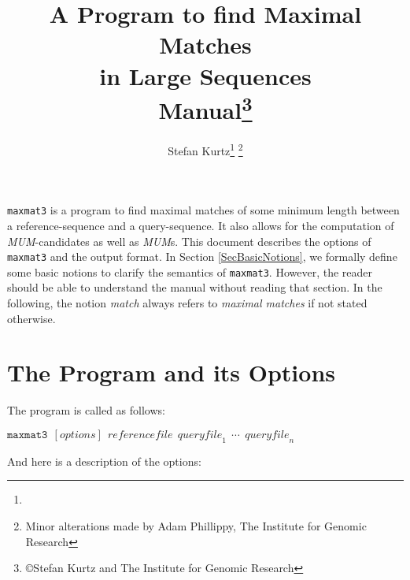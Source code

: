 \documentclass[12pt]{article}
\author{Stefan Kurtz\thanks{\SKaffiliation} \thanks{Minor alterations
  made by Adam Phillippy, The Institute for Genomic Research}}
\title{\textbf{A Program to find Maximal Matches}\\
       \textbf{in Large Sequences}\\[2mm]
       \textbf{Manual}\footnote{\copyright Stefan Kurtz and The
       Institute for Genomic Research}}
\newcommand{\MMthree}{\texttt{maxmat3}\xspace}
\newcommand{\MUM}[0]{\textit{MUM}\xspace}
\begin{document}
\maketitle

\MMthree is a program to find maximal matches of some minimum length 
between a reference-sequence and a query-sequence.  It also allows for
the computation of \MUM-candidates as well as \MUM{s}. This document
describes the options of \MMthree and the output format. In Section 
\ref{SecBasicNotions}, we formally define some basic notions to clarify
the semantics of \MMthree. However, the reader should be able to understand 
the manual without reading that section. In the following, the notion
\emph{match}  always refers to \emph{maximal matches} if not stated
otherwise.

\section{The Program and its Options}

The program is called as follows:

$\MMthree~~[\mathit{options}]~~\mathit{referencefile}~~
           \mathit{queryfile}_{1}~~\cdots~~\mathit{queryfile}_{n}$

And here is a description of the options:
\end{document}
